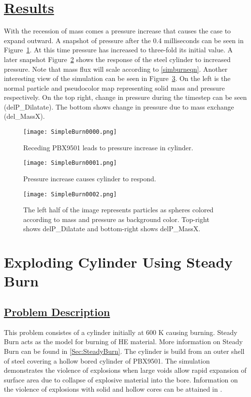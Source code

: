 \newpage

\section*{\underline{Results}}
With the recession of mass comes a pressure increase that causes the case to expand outward. 
A snapshot of pressure after the 0.4 milliseconds can be seen in Figure~\ref{figsimburn1}.  At this time
pressure has increased to three-fold its initial value.  A later snapshot Figure~\ref{figsimburn2} shows
the response of the steel cylinder to increased pressure.  Note that mass flux will scale according
to \ref{simburneqn}.  Another interesting view of the simulation can be seen in Figure~\ref{figsimburn3}.
On the left is the normal particle and pseudocolor map representing solid mass and pressure respectively.
On the top right, change in pressure during the timestep can be seen (delP\_Dilatate).  The bottom shows
change in pressure due to mass exchange (del\_MassX).  


\begin{figure}
  \center
  \texttt{[image: SimpleBurn0000.png]}

  \caption{Receding PBX9501 leads to pressure increase in cylinder.}
  \label{figsimburn1}
\end{figure}

\begin{figure}
  \center
  \texttt{[image: SimpleBurn0001.png]}

  \caption{Pressure increase causes cylinder to respond.}
  \label{figsimburn2}
\end{figure}

\begin{figure}
  \center
  \texttt{[image: SimpleBurn0002.png]}

  \caption{The left half of the image represents particles as spheres colored according to mass and pressure as background color.  Top-right shows delP\_Dilatate and bottom-right shows delP\_MassX.}
  \label{figsimburn3}
\end{figure}

\newpage


%
\section*{\center Exploding Cylinder Using Steady Burn}
\subsection*{\underline{Problem Description}}
This problem consistes of a cylinder initially at 600 K causing burning.  Steady Burn acts as the model for burning of HE material.  More information on Steady Burn can be found in \ref{Sec:SteadyBurn}.  The cylinder is build from an outer shell of steel covering a hollow bored cylinder of PBX9501.  The simulation demonstrates the violence of explosions when large voids allow rapid expansion of surface area due to collapse of explosive material into the bore.  Information on the violence of explosions with solid and hollow cores can be attained in \cite{ref:wighteddings}.  

